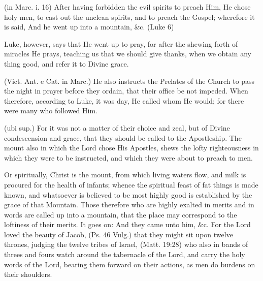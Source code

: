  

 (in Marc. i. 16) After having forbidden the evil spirits to preach Him, He chose holy men, to cast out the unclean spirits, and to preach the Gospel; wherefore it is said, And he went up into a mountain, \&c. (Luke 6)

 Luke, however, says that He went up to pray, for after the shewing forth of miracles He prays, teaching us that we should give thanks, when we obtain any thing good, and refer it to Divine grace.

 (Vict. Ant. e Cat. in Marc.) He also instructs the Prelates of the Church to pass the night in prayer before they ordain, that their office be not impeded. When therefore, according to Luke, it was day, He called whom He would; for there were many who followed Him.

 (ubi sup.) For it was not a matter of their choice and zeal, but of Divine condescension and grace, that they should be called to the Apostleship. The mount also in which the Lord chose His Apostles, shews the lofty righteousness in which they were to be instructed, and which they were about to preach to men.

 Or spiritually, Christ is the mount, from which living waters flow, and milk is procured for the health of infants; whence the spiritual feast of fat things is made known, and whatsoever is believed to be most highly good is established by the grace of that Mountain. Those therefore who are highly exalted in merits and in words are called up into a mountain, that the place may correspond to the loftiness of their merits. It goes on: And they came unto him, \&c. For the Lord loved the beauty of Jacob, (Ps. 46 Vulg.) that they might sit upon twelve thrones, judging the twelve tribes of Israel, (Matt. 19:28) who also in bands of threes and fours watch around the tabernacle of the Lord, and carry the holy words of the Lord, bearing them forward on their actions, as men do burdens on their shoulders.


